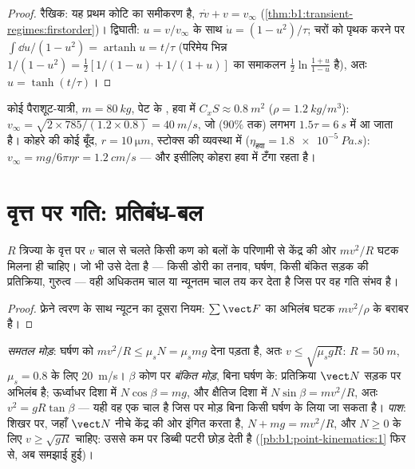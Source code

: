 \begin{proof}
रैखिक: यह प्रथम कोटि का समीकरण है, $\tau\dot v + v = v_\infty$
(\cref{thm:b1:transient-regimes:firstorder})। द्विघाती: $u = v/v_\infty$ के
साथ $\dot u = (1 - u^2)/\tau$; चरों को पृथक करने पर
$\int\dd u/(1 - u^2) = \operatorname{artanh}u = t/\tau$ (परिमेय भिन्न
$1/(1 - u^2) = \tfrac12[1/(1 - u) + 1/(1 + u)]$ का समाकलन
$\tfrac12\ln\frac{1 + u}{1 - u}$ है), अतः $u = \tanh(t/\tau)$।
\end{proof}

\begin{example}[दो सीमांत वेग]\label{ex:b1:newton-dynamics:terminal}
कोई पैराशूट-यात्री, $m = \qty{80}{kg}$, पेट के , हवा में
$C_xS \approx \qty{0.8}{m^2}$ ($\rho = \qty{1.2}{kg/m^3}$): $v_\infty = \sqrt{2 \times 785/(1.2
\times 0.8)} = \qty{40}{m/s}$, जो ($90\%$ तक) लगभग $1.5\tau =
\qty{6}{s}$ में आ जाता है। कोहरे की कोई बूँद, $r = \qty{10}{\micro m}$,
स्टोक्स की व्यवस्था में ($\eta_{\text{हवा}} = \qty{1.8e-5}{Pa.s}$): $v_\infty = mg/6\pi\eta r =
\qty{1.2}{cm/s}$ --- और इसीलिए कोहरा हवा में टँगा रहता है।
\end{example}

\section{वृत्त पर गति: प्रतिबंध-बल}

\begin{proposition}[अभिकेंद्र की माँग]\label{prop:b1:newton-dynamics:centripetal}
$R$ त्रिज्या के वृत्त पर $v$ चाल से चलते किसी कण को बलों के परिणामी से
केंद्र की ओर $mv^2/R$ घटक मिलना ही चाहिए। जो भी उसे देता है --- किसी डोरी
का तनाव, घर्षण, किसी बंकित सड़क की प्रतिक्रिया, गुरुत्व --- वही अधिकतम चाल
या न्यूनतम चाल तय कर देता है जिस पर वह गति संभव है।
\end{proposition}

\begin{proof}
फ्रेने त्वरण के साथ न्यूटन का दूसरा नियम: $\sum\vect F$ का अभिलंब घटक
$mv^2/\rho$ के बराबर है।
\end{proof}

\begin{example}[तीन वृत्त]\label{ex:b1:newton-dynamics:circles}
\emph{समतल मोड़}: घर्षण को $mv^2/R \leq \mu_sN = \mu_smg$ देना पड़ता है,
अतः $v \leq \sqrt{\mu_sgR}$: $R = \qty{50}{m}$, $\mu_s = 0.8$ के लिए
\qty{20}{m/s}। $\beta$ कोण पर \emph{बंकित मोड़}, बिना घर्षण के: प्रतिक्रिया
$\vect N$ सड़क पर अभिलंब है; ऊर्ध्वाधर दिशा में $N\cos\beta = mg$, और क्षैतिज
दिशा में $N\sin\beta = mv^2/R$, अतः $v^2 = gR\tan\beta$ --- यही वह एक चाल है
जिस पर मोड़ बिना किसी घर्षण के लिया जा सकता है। \emph{पाश}: शिखर पर, जहाँ
$\vect N$ नीचे केंद्र की ओर इंगित करता है, $N + mg =
mv^2/R$, और $N \geq 0$ के लिए $v \geq \sqrt{gR}$ चाहिए: उससे कम पर डिब्बी
पटरी छोड़ देती है (\cref{pb:b1:point-kinematics:1} फिर से, अब समझाई हुई)।
\end{example}

